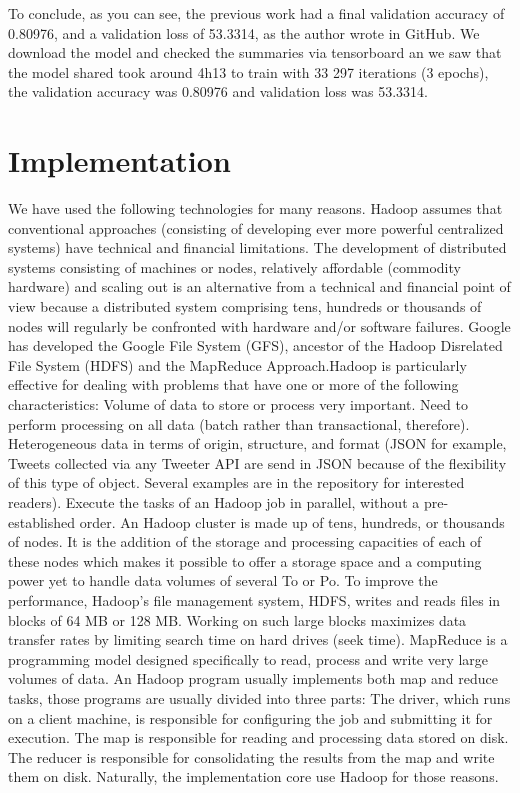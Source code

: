 \documentclass{acmtog} %
\begin{document}
To conclude, as you can see, the previous work had a final validation accuracy of 0.80976, and a validation loss of 53.3314, as the author wrote in GitHub. We download the model and checked the summaries via tensorboard an we saw that the model shared took around 4h13 to train with 33 297 iterations (3 epochs), the validation accuracy was 0.80976 and validation loss was 53.3314.

\section{Implementation}
\label{sec:implementation}

We have used the following technologies for many reasons. Hadoop assumes that conventional approaches (consisting of developing ever more powerful centralized systems) have technical and financial limitations. The development of distributed systems consisting of machines or nodes, relatively affordable (commodity hardware) and scaling out is an alternative from a technical and financial point of view because a distributed system comprising tens, hundreds or thousands of nodes will regularly be confronted with hardware and/or software failures. Google has developed the Google File System (GFS), ancestor of the Hadoop Disrelated File System (HDFS) \cite{Baltas17} and the MapReduce Approach.Hadoop is particularly effective for dealing with problems that have one or more of the following characteristics: Volume of data to store or process very important. Need to perform processing on all data (batch rather than transactional, therefore). Heterogeneous data in terms of origin, structure, and format (JSON for example, Tweets collected via any Tweeter API are send in JSON because of the flexibility of this type of object. Several examples are in the repository for interested readers). Execute the tasks of an Hadoop job in parallel, without a pre-established order. An Hadoop cluster is made up of tens, hundreds, or thousands of nodes. It is the addition of the storage and processing capacities of each of these nodes which makes it possible to offer a storage space and a computing power yet to handle data volumes of several To or Po. To improve the performance, Hadoop's file management system, HDFS, writes and reads files in blocks of 64 MB or 128 MB. Working on such large blocks maximizes data transfer rates by limiting search time on hard drives (seek time). MapReduce is a programming model designed specifically to read, process and write very large volumes of data. An Hadoop program usually implements both map and reduce tasks, those programs are usually divided into three parts: The driver, which runs on a client machine, is responsible for configuring the job and submitting it for execution. The map is responsible for reading and processing data stored on disk. The reducer is responsible for consolidating the results from the map and write them on disk. Naturally, the implementation core use Hadoop for those reasons.
\end{document}

